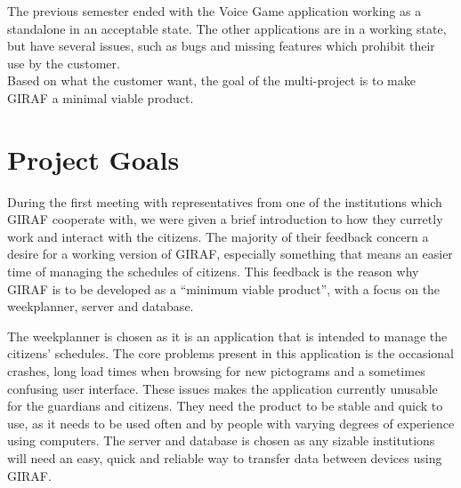 The previous semester ended with the Voice Game application working as a
standalone in an acceptable state. The other applications are in a working
state, but have several issues, such as bugs and missing features which
prohibit their use by the customer.\\
Based on what the customer want, the goal of the multi-project is to make GIRAF
a minimal viable product.
  
\section{Project Goals}
 During the first meeting with representatives from one of the
institutions which GIRAF cooperate with, we were given a brief introduction to
how they curretly work and interact with the citizens. The majority of their
feedback concern a desire for a working version of GIRAF, especially something
that means an easier time of managing the schedules of citizens. This feedback
is the reason why GIRAF is to be developed as a ``minimum viable product'',
with a focus on the weekplanner, server and database.\nl

The weekplanner is chosen as it is an application that is intended to manage
the citizens' schedules. The core problems present in this application is
the occasional crashes, long load times when browsing for new pictograms and a
sometimes confusing user interface. These issues makes the application currently
unusable for the guardians and citizens. They need the product to be stable and
quick to use, as it needs to be used often and by people with varying degrees of
experience using computers. The server and database is chosen as any sizable
institutions will need an easy, quick and reliable way to transfer data between
devices using GIRAF.


